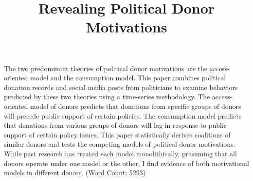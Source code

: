 \documentclass[12pt,]{article}
\title{Revealing Political Donor Motivations  }
\author{}
\date{}
\renewenvironment{abstract}
 {{%
    \setlength{\leftmargin}{0mm}
    \setlength{\rightmargin}{\leftmargin}%
  }%
  \relax}
 {\endlist}
\begin{document}
%    


{%
\setlength{\parindent}{0pt}
\thispagestyle{plain}
{\fontsize{18}{20}\selectfont\raggedright 
\maketitle  %

}

{
   \vskip 13.5pt\relax \normalsize\fontsize{11}{12} 
 

}

}








\begin{abstract}

    \hbox{\vrule height .2pt width 39.14pc}

    \vskip 8.5pt %

\noindent The two predominant theories of political donor motivations
are the access-oriented model and the consumption model. This paper
combines political donation records and social media posts from
politicians to examine behaviors predicted by these two theories using a
time-series methodology. The access-oriented model of donors predicts
that donations from specific groups of donors will precede public
support of certain policies. The consumption model predicts that
donations from various groups of donors will lag in response to public
support of certain policy issues. This paper statistically derives
coalitions of similar donors and tests the competing models of political
donor motivations. While past research has treated each model
monolithically, presuming that all donors operate under one model or the
other, I find evidence of both motivational models in different donors.
(Word Count: 5293)


    \hbox{\vrule height .2pt width 39.14pc}


\end{abstract}


\vskip -8.5pt



\noindent \doublespacing 
\end{document}
